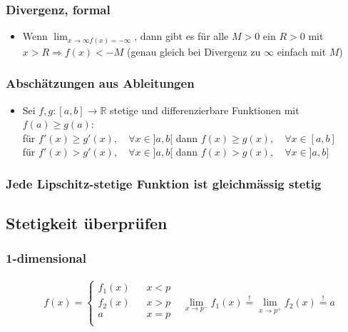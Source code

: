 \documentclass[a3paper, 11pt, landscape]{scrartcl}
\begin{document}
\begin{multicols*}{3}
	\subsubsection{Divergenz, formal}
	\begin{itemize}
	    \item Wenn $\lim_{x\to\infty f(x)=-\infty}$, dann gibt es für alle $M>0$ ein $R>0$ mit $x>R \Rightarrow f(x)<-M$ (genau gleich bei Divergenz zu $\infty$ einfach mit $M$)
	\end{itemize}
	
	\subsubsection{Abschätzungen aus Ableitungen}
	\begin{itemize}
	    \item Sei $f,g:[a,b]\to\mathbb{R}$ stetige und differenzierbare Funktionen mit $f(a)\geq g(a)$:\\
	    für $f'(x)\geq g'(x),\quad \forall x\in ]a,b[$ dann $f(x)\geq g(x), \quad \forall x\in [a,b]$\\
	    für $f'(x) > g'(x),\quad \forall x\in ]a,b[$ dann $f(x) > g(x), \quad \forall x\in ]a,b]$
	\end{itemize}
	
	\subsubsection{Jede Lipschitz-stetige Funktion ist gleichmässig stetig}
	
	\subsection{Stetigkeit überprüfen}
	\subsubsection{1-dimensional}
	\begin{align*}
		&f(x)=
		\begin{cases}
			f_1(x) \hspace{10pt} &x<p\\
			f_2(x) & x>p\\
			a &x=p\\							
		\end{cases}
		&\lim_{x \rightarrow p^-} f_1(x) \overset{!}{=} \lim_{x \rightarrow p^+} f_2(x) \overset{!}{=} a
	\end{align*}


\end{multicols*}
\end{document}

